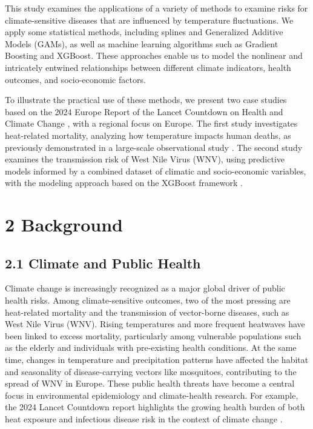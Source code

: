 \documentclass[
]{krantz}
\begin{document}
This study examines the applications of a variety of methods to examine risks for climate-sensitive diseases that are influenced by temperature fluctuations. We apply some statistical methods, including splines and Generalized Additive Models (GAMs), as well as machine learning algorithms such as Gradient Boosting and XGBoost. These approaches enable us to model the nonlinear and intricately entwined relationships between different climate indicators, health outcomes, and socio-economic factors.

To illustrate the practical use of these methods, we present two case studies based on the 2024 Europe Report of the Lancet Countdown on Health and Climate Change \citep{vandaalen2024}, with a regional focus on Europe. The first study investigates heat-related mortality, analyzing how temperature impacts human deaths, as previously demonstrated in a large-scale observational study \citep{gasparrini2015}. The second study examines the transmission risk of West Nile Virus (WNV), using predictive models informed by a combined dataset of climatic and socio-economic variables, with the modeling approach based on the XGBoost framework \citep{chen2016xgboost}.

\chapter{2 Background}\label{background}

\section{2.1 Climate and Public Health}\label{climate-and-public-health}

Climate change is increasingly recognized as a major global driver of public health risks. Among climate-sensitive outcomes, two of the most pressing are heat-related mortality and the transmission of vector-borne diseases, such as West Nile Virus (WNV). Rising temperatures and more frequent heatwaves have been linked to excess mortality, particularly among vulnerable populations such as the elderly and individuals with pre-existing health conditions. At the same time, changes in temperature and precipitation patterns have affected the habitat and seasonality of disease-carrying vectors like mosquitoes, contributing to the spread of WNV in Europe. These public health threats have become a central focus in environmental epidemiology and climate-health research. For example, the 2024 Lancet Countdown report highlights the growing health burden of both heat exposure and infectious disease risk in the context of climate change \citep{vandaalen2024}.
\end{document}
